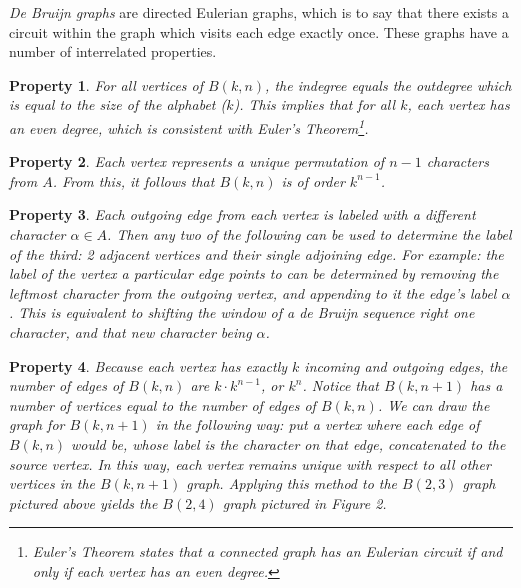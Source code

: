 \documentclass[12pt]{article}
\newtheorem{property}{Property}[section]
\newcounter{example}[section]
\begin{document}
\emph{De Bruijn graphs} are directed Eulerian graphs, which is to say that there exists a circuit within the graph which visits each edge exactly once. These graphs have a number of interrelated properties. 

\begin{property}
\normalfont For all vertices of $B(k,n)$, the indegree equals the outdegree which is equal to the size of the alphabet ($k$). This implies that for all $k$, each vertex has an even degree, which is consistent with Euler’s Theorem\footnote{Euler’s Theorem states that a connected graph has an Eulerian circuit if and only if each vertex has an even degree. }.
\end{property}

\begin{property}
\normalfont Each vertex represents a unique permutation of $n-1$ characters from $A$. From this, it follows that $B(k,n)$ is of order $k^{n-1}$.
\end{property}

\begin{property}
\normalfont Each outgoing edge from each vertex is labeled with a different character $\alpha\in A$. Then any two of the following can be used to determine the label of the third: 2 adjacent vertices and their single adjoining edge. For example: the label of the vertex a particular edge points to can be determined by removing the leftmost character from the outgoing vertex, and appending to it the edge’s label $\alpha$. This is equivalent to shifting the window of a de Bruijn sequence right one character, and that new character being $\alpha$.
\end{property}

\begin{property}
\normalfont Because each vertex has exactly $k$ incoming and outgoing edges, the number of edges of $B(k,n)$ are $k\cdot k^{n-1}$, or $k^{n}$. Notice that $B(k,n+1)$ has a number of vertices equal to the number of edges of $B(k,n)$. We can draw the graph for $B(k,n+1)$ in the following way: put a vertex where each edge of $B(k,n)$ would be, whose label is the character on that edge, concatenated to the source vertex. In this way, each vertex remains unique with respect to all other vertices in the $B(k,n+1)$ graph. Applying this method to the $B(2,3)$ graph pictured above yields the $B(2,4)$ graph pictured in Figure 2.
\end{property}
\end{document}
